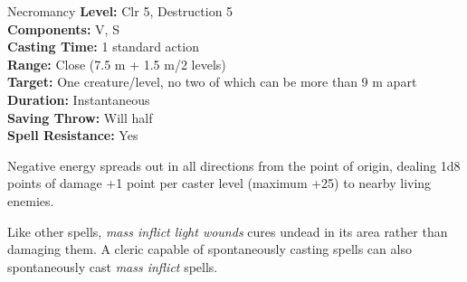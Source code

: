 {Necromancy}
{
	\textbf{Level:}
	Clr 5, Destruction 5\\
	\textbf{Components:}
	V, S\\
	\textbf{Casting Time:}
	1 standard action\\
	\textbf{Range:}
	Close (7.5 m + 1.5 m/2 levels)\\
	\textbf{Target:}
	One creature/level, no two of which can be more than 9 m apart\\
	\textbf{Duration:}
	Instantaneous\\
	\textbf{Saving Throw:}
	Will half\\
	\textbf{Spell Resistance:}
	Yes\\
}
{
	Negative energy spreads out in all directions from the point of origin, dealing 1d8 points of damage +1 point per caster level (maximum +25) to nearby living enemies.

	Like other  spells, \emph{mass inflict light wounds} cures undead in its area rather than damaging them. A cleric capable of spontaneously casting  spells can also spontaneously cast \emph{mass inflict} spells.

}
